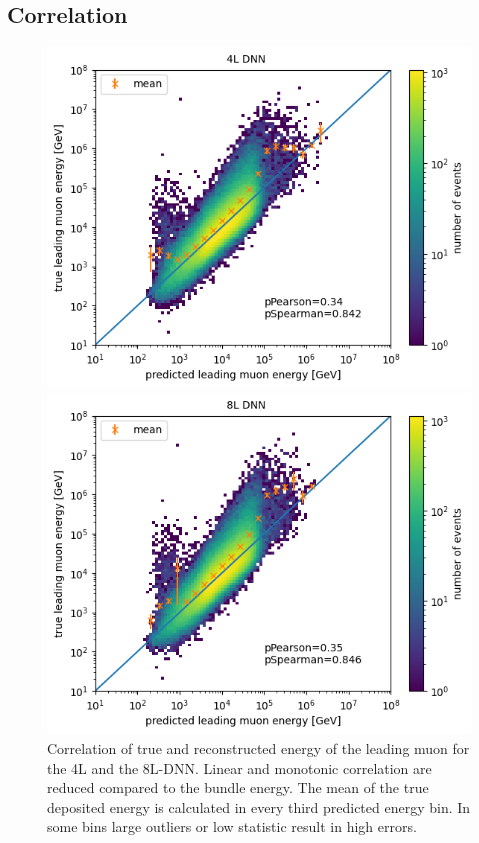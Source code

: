 \documentclass[
  tucolor,       %
  BCOR=12mm,     %
  parskip=half,  %
  open=any,      %
  cleardoublepage=plain,  %
]{tudothesis}
\begin{document}
\subsection{Correlation}
\begin{figure}
  \centering
  \begin{minipage}[t]{0.49\textwidth}
    \includegraphics[width=\textwidth]{Plots/Correlation leading muon energy small DNN (4L)}
  \end{minipage}
  \begin{minipage}[t]{0.49\textwidth}
    \includegraphics[width=\textwidth]{Plots/Correlation leading muon energy std DNN (8L)}
  \end{minipage}
  \caption{Correlation of true and reconstructed energy of the leading muon for the 4L and the 8L-DNN. Linear and monotonic correlation are reduced compared to the bundle energy. The mean of the true deposited energy is calculated in every third predicted energy bin. In some bins large outliers or low statistic result in high errors.}
  \label{fig:Correlation entry}
\end{figure}
\end{document}
